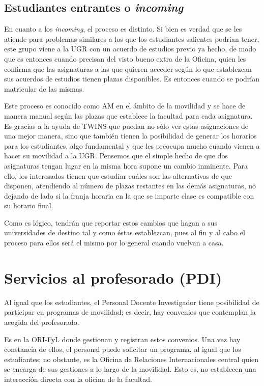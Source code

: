 \subsection{Estudiantes entrantes o \textit{incoming}}

En cuanto a los \textit{incoming}, el proceso es distinto. Si bien es verdad que se les atiende para problemas similares a los que los estudiantes salientes podrían tener, este grupo viene a la UGR con un acuerdo de estudios previo ya hecho, de modo que es entonces cuando precisan del visto bueno extra de la Oficina, quien les confirma que las asignaturas a las que quieren acceder según lo que establezcan sus acuerdos de estudios tienen plazas disponibles. Es entonces cuando se podrían matricular de las mismas.

Este proceso es conocido como \gls{AM} en el ámbito de la movilidad y se hace de manera manual según las plazas que establece la facultad para cada asignatura. Es gracias a la ayuda de TWINS que puedan no sólo ver estas asignaciones de una mejor manera, sino que también tienen la posibilidad de generar los horarios para los estudiantes, algo fundamental y que les preocupa mucho cuando vienen a hacer su movilidad a la UGR. Pensemos que el simple hecho de que dos asignaturas tengan lugar en la misma hora supone un cambio inminente. Para ello, los interesados tienen que estudiar cuáles son las alternativas de que disponen, atendiendo al número de plazas restantes en las demás asignaturas, no dejando de lado si la franja horaria en la que se imparte clase es compatible con su horario final.

Como es lógico, tendrán que reportar estos cambios que hagan a sus universidades de destino tal y como éstas establezcan, pues al fin y al cabo el proceso para ellos será el mismo por lo general cuando vuelvan a casa.


\section{Servicios al profesorado (PDI)}

Al igual que los estudiantes, el Personal Docente Investigador tiene posibilidad de participar en programas de movilidad; es decir, hay convenios que contemplan la acogida del profesorado.

Es en la ORI-FyL donde gestionan y registran estos convenios. Una vez hay constancia de ellos, el personal puede solicitar un programa, al igual que los estudiantes; no obstante, es la Oficina de Relaciones Internacionales central quien se encarga de sus gestiones a lo largo de la movilidad. Esto es, no establecen una interacción directa con la oficina de la facultad.

